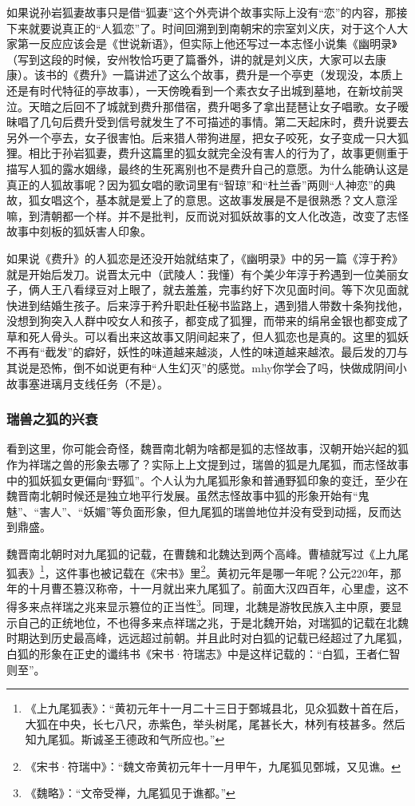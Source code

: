 \documentclass[UTF8, 12pt, A4paper]{article}
\begin{document}
如果说孙岩狐妻故事只是借“狐妻”这个外壳讲个故事实际上没有“恋”的内容，那接下来就要说真正的“人狐恋”了。时间回溯到到南朝宋的宗室刘义庆，对于这个人大家第一反应应该会是《世说新语》，但实际上他还写过一本志怪小说集《幽明录》（写到这段的时候，安州牧恰巧更了篇番外，讲的就是刘义庆，大家可以去康康）。该书的《费升》一篇讲述了这么个故事，费升是一个亭吏（发现没，本质上还是有时代特征的亭故事），一天傍晚看到一个素衣女子出城到墓地，在新坟前哭泣。天暗之后回不了城就到费升那借宿，费升喝多了拿出琵琶让女子唱歌。女子暧昧唱了几句后费升受到信号就发生了不可描述的事情。第二天起床时，费升说要去另外一个亭去，女子很害怕。后来猎人带狗进屋，把女子咬死，女子变成一只大狐狸。相比于孙岩狐妻，费升这篇里的狐女就完全没有害人的行为了，故事更侧重于描写人狐的露水姻缘，最终的生死离别也不是费升自己的意愿。为什么能确认这是真正的人狐故事呢？因为狐女唱的歌词里有“智琼”和“杜兰香”两则“人神恋”的典故，狐女唱这个，基本就是爱上了的意思。这故事发展是不是很熟悉？文人意淫嘛，到清朝都一个样。并不是批判，反而说对狐妖故事的文人化改造，改变了志怪故事中刻板的狐妖害人印象。

如果说《费升》的人狐恋是还没开始就结束了，《幽明录》中的另一篇《淳于矜》就是开始后发刀。说晋太元中（武陵人：我懂）有个美少年淳于矜遇到一位美丽女子，俩人王八看绿豆对上眼了，就去羞羞，完事约好下次见面时间。等下次见面就快进到结婚生孩子。后来淳于矜升职赴任秘书监路上，遇到猎人带数十条狗找他，没想到狗突入人群中咬女人和孩子，都变成了狐狸，而带来的绢帛金银也都变成了草和死人骨头。可以看出来这故事又阴间起来了，但人狐恋也是真的。这里的狐妖不再有“截发”的癖好，妖性的味道越来越淡，人性的味道越来越浓。最后发的刀与其说是恐怖，倒不如说更有种“人生幻灭”的感觉。mhy你学会了吗，快做成阴间小故事塞进璃月支线任务（不是）。

\subsubsection{瑞兽之狐的兴衰}

看到这里，你可能会奇怪，魏晋南北朝为啥都是狐的志怪故事，汉朝开始兴起的狐作为祥瑞之兽的形象去哪了？实际上上文提到过，瑞兽的狐是九尾狐，而志怪故事中的狐妖狐女更偏向“野狐”。个人认为九尾狐形象和普通野狐印象的变迁，至少在魏晋南北朝时候还是独立地平行发展。虽然志怪故事中狐的形象开始有“鬼魅”、“害人”、“妖媚”等负面形象，但九尾狐的瑞兽地位并没有受到动摇，反而达到鼎盛。

魏晋南北朝时对九尾狐的记载，在曹魏和北魏达到两个高峰。曹植就写过《上九尾狐表》\footnote{《上九尾狐表》：“黄初元年十一月二十三日于鄄城县北，见众狐数十首在后，大狐在中央，长七八尺，赤紫色，举头树尾，尾甚长大，林列有枝甚多。然后知九尾狐。斯诚圣王德政和气所应也。”}，这件事也被记载在《宋书》里\footnote{《宋书·符瑞中》：“魏文帝黄初元年十一月甲午，九尾狐见鄄城，又见谯。}。黄初元年是哪一年呢？公元220年，那年的十月曹丕篡汉称帝，十一月就出来九尾狐了。前面大汉四百年，心里虚，这不得多来点祥瑞之兆来显示篡位的正当性\footnote{《魏略》：“文帝受禅，九尾狐见于谯都。”}。同理，北魏是游牧民族入主中原，要显示自己的正统地位，不也得多来点祥瑞之兆，于是北魏开始，对瑞狐的记载在北魏时期达到历史最高峰，远远超过前朝。并且此时对白狐的记载已经超过了九尾狐，白狐的形象在正史的谶纬书《宋书·符瑞志》中是这样记载的：“白狐，王者仁智则至”。
\end{document}
